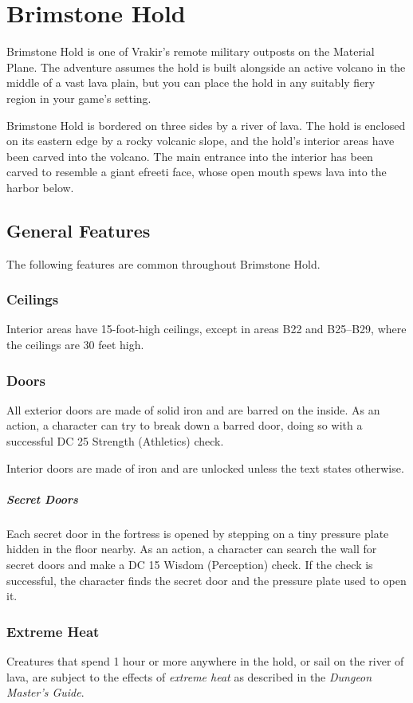\documentclass[10pt,a4paper,twoside,bg=print,twocolumn,openany,nodeprecatedcode]{dndbook}
\begin{document}
\section{Brimstone Hold}
Brimstone Hold is one of Vrakir's remote military outposts on the Material Plane. The adventure assumes the hold is built alongside an active volcano in the middle of a vast lava plain, but you can place the hold in any suitably fiery region in your game's setting.

Brimstone Hold is bordered on three sides by a river of lava. The hold is enclosed on its eastern edge by a rocky volcanic slope, and the hold's interior areas have been carved into the volcano. The main entrance into the interior has been carved to resemble a giant efreeti face, whose open mouth spews lava into the harbor below.

\subsection{General Features}
The following features are common throughout Brimstone Hold.

\subsubsection{Ceilings}
Interior areas have 15-foot-high ceilings, except in areas B22 and B25–B29, where the ceilings are 30 feet high.

\subsubsection{Doors}
All exterior doors are made of solid iron and are barred on the inside. As an action, a character can try to break down a barred door, doing so with a successful DC 25 Strength (Athletics) check.

Interior doors are made of iron and are unlocked unless the text states otherwise.

\subparagraph{Secret Doors}
Each secret door in the fortress is opened by stepping on a tiny pressure plate hidden in the floor nearby. As an action, a character can search the wall for secret doors and make a DC 15 Wisdom (Perception) check. If the check is successful, the character finds the secret door and the pressure plate used to open it.

\subsubsection{Extreme Heat}
Creatures that spend 1 hour or more anywhere in the hold, or sail on the river of lava, are subject to the effects of \textit{extreme heat} as described in the \textit{Dungeon Master's Guide}.
\end{document}
